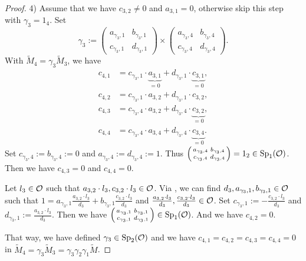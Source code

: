 \begin{lemma}[$solveR$]
\begin{proof}
4) Assume that we have $c_{3,2} \ne 0$ and $a_{3,1} = 0$, otherwise skip this step with $\gamma_3 = 1_4$. Set
\[ \gamma_3 := \begin{pmatrix}
a_{\gamma_3,1} & b_{\gamma_3,1} \\
c_{\gamma_3,1} & d_{\gamma_3,1}
\end{pmatrix} \times \begin{pmatrix}
a_{\gamma_3,4} & b_{\gamma_3,4} \\
c_{\gamma_3,4} & d_{\gamma_3,4}
\end{pmatrix} . \]
With $\tilde{M}_4 = \gamma_3 \tilde{M}_3$, we have
\begin{align*}
c_{4,1} &= c_{\gamma_3,1} \cdot \underbrace{a_{3,1}}_{=0} + d_{\gamma_3,1} \cdot \underbrace{c_{3,1}}_{=0} , \\
c_{4,2} &= c_{\gamma_3,1} \cdot a_{3,2} + d_{\gamma_3,1} \cdot c_{3,2} , \\
c_{4,3} &= c_{\gamma_3,4} \cdot a_{3,2} + d_{\gamma_3,4} \cdot \underbrace{c_{3,2}}_{=0} , \\
c_{4,4} &= c_{\gamma_3,4} \cdot a_{3,4} + d_{\gamma_3,4} \cdot \underbrace{c_{3,4}}_{=0} .
\end{align*}
Set $c_{\gamma_3,4} := b_{\gamma_3,4} := 0$ and $a_{\gamma_3,4} := d_{\gamma_3,4} := 1$. Thus $\left( \begin{smallmatrix} a_{\gamma_3,4} & b_{\gamma_3,4} \\ c_{\gamma_3,4} & d_{\gamma_3,4} \end{smallmatrix} \right) = 1_2 \in \operatorname{Sp}_1(\mathcal{O})$. Then we have $c_{4,3} = 0$ and $c_{4,4} = 0$.

Let $l_3 \in \mathcal{O}$ such that $a_{3,2} \cdot l_3, c_{3,2} \cdot l_3 \in \mathcal{O}$. Via , we can find $d_3,a_{\gamma_3,1},b_{\gamma_3,1} \in \mathcal{O}$ such that $1 = a_{\gamma_3,1} \frac{a_{3,2} \cdot l_3}{d_3} + b_{\gamma_3,1} \frac{c_{3,2} \cdot l_3}{d_3}$ and $\frac{a_{3,2} \cdot l_3}{d_3}, \frac{c_{3,2} \cdot l_3}{d_3} \in \mathcal{O}$. Set $c_{\gamma_3,1} := -\frac{c_{3,2} \cdot l_3}{d_3}$ and $d_{\gamma_3,1} := \frac{a_{3,2} \cdot l_3}{d_3}$. Then we have $\left( \begin{smallmatrix} a_{\gamma_3,1} & b_{\gamma_3,1} \\ c_{\gamma_3,1} & d_{\gamma_3,1} \end{smallmatrix} \right) \in \operatorname{Sp}_1(\mathcal{O})$. And we have $c_{4,2} = 0$.

That way, we have defined $\gamma_3 \in \operatorname{Sp}_2(\mathcal{O})$ and we have $c_{4,1} = c_{4,2} = c_{4,3} = c_{4,4} = 0$ in $\tilde{M}_4 = \gamma_3 \tilde{M}_3 = \gamma_3 \gamma_2 \gamma_1 \tilde{M}$.


\end{proof}
\end{lemma}
